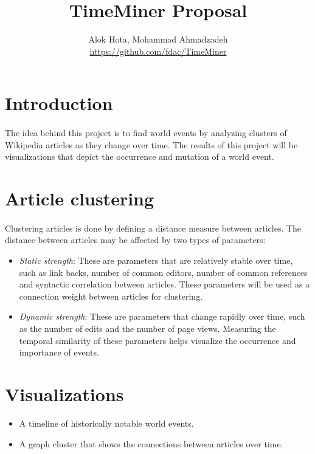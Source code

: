 \documentclass[11pt]{article}
\title{\textbf{TimeMiner Proposal}}
\author{Alok Hota, Mohammad Ahmadzadeh\\\href{https://github.com/fdac/TimeMiner}{https://github.com/fdac/TimeMiner}}
\begin{document}
\maketitle

\section{Introduction}
\paragraph{}
The idea behind this project is to find world events by analyzing clusters of Wikipedia articles as they change over time. The results of this project will be visualizations that depict the occurrence and mutation of a world event.

\section{Article clustering}
\paragraph{}
Clustering articles is done by defining a distance measure between articles. The distance between articles may be affected by two types of parameters:
	\begin{itemize}
		\item \textit{Static strength}: These are parameters that are relatively stable over time, such as link backs, number of common editors, number of common references and syntactic correlation between articles. These parameters will be used as a connection weight between articles for clustering.
		\item \textit{Dynamic strength}: These are parameters that change rapidly over time, such as the number of edits and the number of page views. Measuring the temporal similarity of these parameters helps visualize the occurrence and importance of events.
	\end{itemize}

\section{Visualizations}
\begin{itemize}
	\item A timeline of historically notable world events.
	\item A graph cluster that shows the connections between articles over time. 
\end{itemize}
\end{document}
